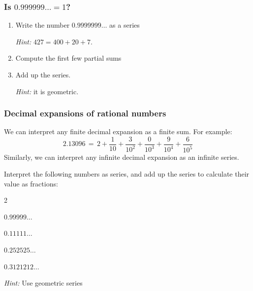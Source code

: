 \documentclass[14pt]{beamer}
\begin{document}
\begin{frame}[t]
	\frametitle{Is $\displaystyle 0.999999\ldots = 1$?}

	\begin{enumerate}
		\item Write the number \; $\displaystyle 0.9999999\ldots$ \; as a series

			\emph{Hint:} $\displaystyle 427 = 400 + 20 + 7$.
			\vspace{.5cm}

		\item Compute the first few partial sums
			\vspace{.5cm}

		\item Add up the series.

			\emph{Hint:} it is geometric.
	\end{enumerate}
\end{frame}

\begin{frame}[t]
	\fontsize{13}{13}\selectfont
	\frametitle{Decimal expansions of rational numbers}

	We can interpret any finite decimal expansion as a finite sum. For example:
	\[
		2.13096 \, = \, 2 + \frac{1}{10}+ \frac{3}{10^{2}}+ \frac{0}{10^{3}}+ \frac{9}{10^{4}}
		+ \frac{6}{10^{5}}
	\]
	Similarly, we can interpret any infinite decimal expansion as an infinite
	series.
	\vspace{.5cm}

	Interpret the following numbers as series, and add up the series to calculate their
	value as fractions:
	\begin{enumerate}
	\end{enumerate}
	\emph{Hint:} Use geometric series
\end{frame}
\end{document}
